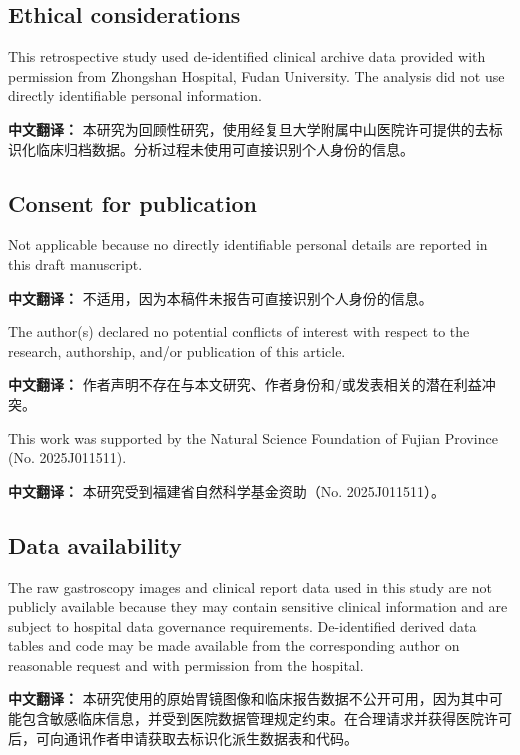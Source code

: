 \documentclass[Afour,sagev,times]{sagej}
\begin{document}
\subsection*{Ethical considerations}
This retrospective study used de-identified clinical archive data provided with permission from Zhongshan Hospital, Fudan University. The analysis did not use directly identifiable personal information.

\textbf{中文翻译：} 本研究为回顾性研究，使用经复旦大学附属中山医院许可提供的去标识化临床归档数据。分析过程未使用可直接识别个人身份的信息。

\subsection*{Consent for publication}
Not applicable because no directly identifiable personal details are reported in this draft manuscript.

\textbf{中文翻译：} 不适用，因为本稿件未报告可直接识别个人身份的信息。

\begin{dci}
The author(s) declared no potential conflicts of interest with respect to the research, authorship, and/or publication of this article.
\end{dci}

\textbf{中文翻译：} 作者声明不存在与本文研究、作者身份和/或发表相关的潜在利益冲突。

\begin{funding}
This work was supported by the Natural Science Foundation of Fujian Province (No. 2025J011511).
\end{funding}

\textbf{中文翻译：} 本研究受到福建省自然科学基金资助（No. 2025J011511）。

\subsection*{Data availability}
The raw gastroscopy images and clinical report data used in this study are not publicly available because they may contain sensitive clinical information and are subject to hospital data governance requirements. De-identified derived data tables and code may be made available from the corresponding author on reasonable request and with permission from the hospital.

\textbf{中文翻译：} 本研究使用的原始胃镜图像和临床报告数据不公开可用，因为其中可能包含敏感临床信息，并受到医院数据管理规定约束。在合理请求并获得医院许可后，可向通讯作者申请获取去标识化派生数据表和代码。
\end{document}
